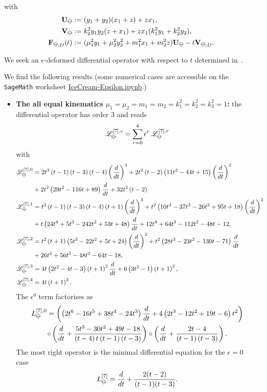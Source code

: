 \documentclass[a4paper,12pt]{article}
\numberwithin{equation}{section}
\numberwithin{figure}{section}
\newcommand{\IceCream}{	\begin{tikzpicture}[scale=0.05]
	\draw[color = black, fill=none] (2,0) arc(0:180:2);
		\draw [black] (-2,0) to (2,0);
		\draw [black] (-2,0) to (0,-2);
                	\draw [black] (2,0) to (0,-2);
	\end{tikzpicture}}
\begin{document}
with
\begin{align}
	\textbf{U}_{\IceCream}&:=(y_1+y_2)(x_1+z)+zx_1,\cr
	\textbf{V}_{\IceCream}&:=k_2^2y_1y_2(z+x_1)+zx_1(k_1^2y_1+k_2^2y_2),\\
	\nonumber  \textbf{F}_{\IceCream;D}(t)&:=
	(\mu_1^2y_1+\mu_2^2y_2^2+m_1^2x_1+m_2^2z) \textbf{U}_{\IceCream}-t \textbf{V}_{\IceCream;D}.
\end{align}

We seek an $\epsilon$-deformed differential
operator with respect to $t$ determined in~\cite{Lairez:2022zkj,Doran:2023yzu}.

We find the following results (some numerical cases are accessible on
the {\tt
  SageMath} worksheet \href{IceCream-Epsilon.ipynb}{IceCream-Epsilon.ipynb}.)
\begin{itemize}
	\item {\bf The all equal kinematics
		$\mu_1=\mu_2=m_1=m_2=k_1^2=k_2^2=k_3^2=1$:} the differential operator
	has order 3 and
	reads
	\begin{equation}
		\mathscr{L}_{\IceCream}^{[7],\epsilon}=\sum_{r=0}^4 \epsilon^r\,\mathscr{L}_{\IceCream}^{[7],r}
	\end{equation}
	with
	\begin{align}
		\mathscr{L}_{\IceCream}^{[7],0}&= 2 t^{3} \left(t -1\right)
		\left(t -3\right) \left(t -4\right) \left(d\over dt\right)^{3}+2 t^{2} \left(t
		-2\right) \left(11 t^{2}-44 t +15\right) \left(d\over dt\right)^{2}\cr&+2 t^{2}
		\left(29 t^{2}-116 t +89\right) {d\over dt} +32 t^{2} \left(t
		-2\right)\cr
		\mathscr{L}_{\IceCream}^{[7],1}&=t^{3} \left(t -1\right) \left(t -3\right) \left(t -4\right) \left(t +1\right) \left(d\over dt\right)^{3}+t^{2} \left(10 t^{4}-37 t^{3}-26 t^{2}+95 t +18\right) \left(d\over dt\right)^{2}\cr&+t \left(24 t^{4}+5 t^{3}-242 t^{2}+53 t +48\right)  {d\over dt} +12 t^{4}+64 t^{3}-112 t^{2}-48 t -12,\cr
		\mathscr{L}_{\IceCream}^{[7],2}&=t^{2} \left(t +1\right) \left(5 t^{3}-22 t^{2}+5 t +24\right) \left(d\over dt\right)^{2}+t^{2} \left(28 t^{3}-23 t^{2}-130 t -71\right)  {d\over dt} \cr&+26 t^{4}+56 t^{3}-48 t^{2}-64 t -18,\cr
		\mathscr{L}_{\IceCream}^{[7],3}&=4 t \left(2 t^{2}-4 t -3\right) \left(t +1\right)^{2}
		{d\over dt}+6 \left(3 t^{2}-1\right) \left(t +1\right)^{2},\cr
		\mathscr{L}_{\IceCream}^{[7],4}&= 4 t \left(t +1\right)^{3}.
	\end{align}
	The $\epsilon^0$ term factorises as
	\begin{multline}
		L_{\IceCream}^{[7],0}=\left(
		\left(2 t^{6}-16 t^{5}+38 t^{4}-24 t^{3}\right) {{d\over dt}} +4 \left(2 t^{3}-12 t^{2}+19 t -6\right) t^{2}\right)\cr\circ
		\left(
		{{d\over dt}} +\frac{5 t^{3}-30 t^{2}+49 t -18}{\left(t -4\right) t \left(t -1\right) \left(t -3\right)}
		\right)\circ \left({{d\over dt}} +\frac{2 t -4}{\left(t -1\right) \left(t -3\right)}
		\right).
	\end{multline}
	The most right operator is the minimal differential equation for the
	$\epsilon=0$ case~\cite{Lairez:2022zkj}
	\begin{equation}
		L_{\IceCream}^{[7]}= {d\over dt}+ {2(t - 2)\over (t - 1)(t - 3)  }.
	\end{equation}
	

\end{itemize}
\end{document}
